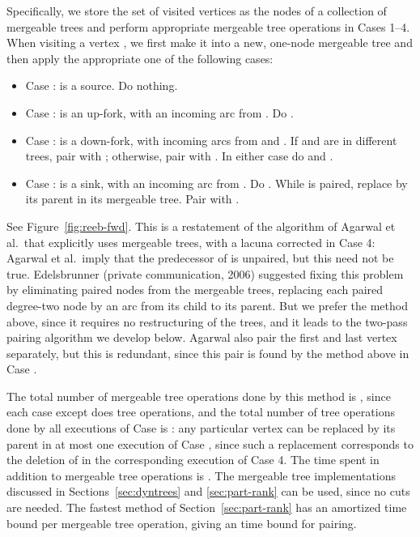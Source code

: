 \documentclass[twoside,leqno,twocolumn]{article}
\begin{document}
Specifically, we store the set of visited vertices as the nodes of a collection of mergeable trees and perform appropriate mergeable tree operations in Cases 1--4.  When visiting a vertex , we first make it into a new, one-node mergeable tree and then apply the appropriate one of the following cases:

\begin{itemize}
\item Case :  is a source.  Do nothing.
\item Case :  is an up-fork, with an incoming arc from . Do .
\item Case :  is a down-fork, with incoming arcs from  and .  If  and  are in different trees, pair  with ; otherwise, pair  with .  In either case do  and .
\item Case :  is a sink, with an incoming arc from .  Do .  While  is paired, replace  by its parent in its mergeable tree.  Pair  with .
\end{itemize}
See Figure~\ref{fig:reeb-fwd}. This is a restatement of the algorithm of Agarwal et al.\ that explicitly uses mergeable trees, with a lacuna corrected in Case 4: Agarwal et al.\ imply that the predecessor of  is unpaired, but this need not be true.  Edelsbrunner (private communication, 2006) suggested fixing this problem by eliminating paired nodes from the mergeable trees, replacing each paired degree-two node by an arc from its child to its parent.  But we prefer the method above, since it requires no restructuring of the trees, and it leads to the two-pass pairing algorithm we develop below.  Agarwal also pair the first and last vertex separately, but this is redundant, since this pair is found by the method above in Case .

The total number of mergeable tree operations done by this method is , since each case except  does  tree operations, and the total number of tree operations done by all executions of Case  is : any particular vertex  can be replaced by its parent in at most one execution of Case ,  since such a replacement corresponds to the deletion of  in the corresponding execution of Case 4.  The time spent in addition to mergeable tree operations is . The mergeable tree implementations discussed in Sections~\ref{sec:dyntrees} and \ref{sec:part-rank} can be used, since no cuts are needed.  The fastest method of Section~\ref{sec:part-rank} has an amortized  time bound per mergeable tree operation, giving an  time bound for pairing.
\end{document}
